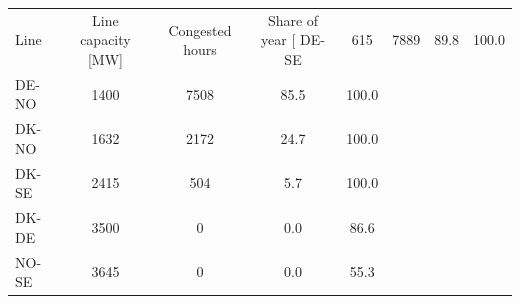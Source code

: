 \begin{tabular}{lcccc}
\toprule
Line & Line capacity [MW] & Congested hours & Share of year [%
\midrule
DE-SE & 615 & 7889 & 89.8 & 100.0 \\
DE-NO & 1400 & 7508 & 85.5 & 100.0 \\
DK-NO & 1632 & 2172 & 24.7 & 100.0 \\
DK-SE & 2415 & 504 & 5.7 & 100.0 \\
DK-DE & 3500 & 0 & 0.0 & 86.6 \\
NO-SE & 3645 & 0 & 0.0 & 55.3 \\
\bottomrule
\end{tabular}
